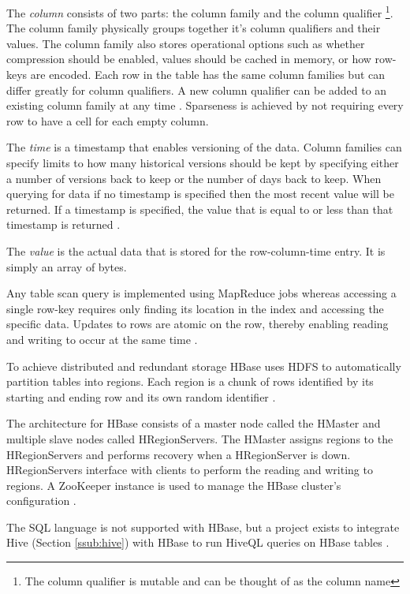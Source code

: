 \documentclass[12pt]{article}
\begin{document}
The \textit{column} consists of two parts: the column family and the column qualifier \footnote{The column qualifier is mutable and can be thought of as the column name}. The column family physically groups together it's column qualifiers and their values. The column family also stores operational options such as whether compression should be enabled, values should be cached in memory, or how row-keys are encoded. Each row in the table has the same column families but can differ greatly for column qualifiers. A new column qualifier can be added to an existing column family at any time \cite{hbasedocs}. Sparseness is achieved by not requiring every row to have a cell for each empty column.

The \textit{time} is a timestamp that enables versioning of the data. Column families can specify limits to how many historical versions should be kept by specifying either a number of versions back to keep or the number of days back to keep. When querying for data if no timestamp is specified then the most recent value will be returned. If a timestamp is specified, the value that is equal to or less than that timestamp is returned \cite{hbasedocs,hbasejimbojw}.

The \textit{value} is the actual data that is stored for the row-column-time entry. It is simply an array of bytes.

Any table scan query is implemented using MapReduce jobs whereas accessing a single row-key requires only finding its location in the index and accessing the specific data. Updates to rows are atomic on the row, thereby enabling reading and writing to occur at the same time \cite{hbaseanalysis}.

To achieve distributed and redundant storage HBase uses HDFS to automatically partition tables into regions. Each region is a chunk of rows identified by its starting and ending row and its own random identifier \cite{hbaseanalysis}.

The architecture for HBase consists of a master node called the HMaster and multiple slave nodes called HRegionServers. The HMaster assigns regions to the HRegionServers and performs recovery when a HRegionServer is down. HRegionServers interface with clients to perform the reading and writing to regions. A ZooKeeper \cite{zookeeper} instance is used to manage the HBase cluster's configuration \cite{hbaseanalysis}.

The SQL language is not supported with HBase, but a project exists to integrate Hive (Section \ref{ssub:hive}) with HBase to run HiveQL queries on HBase tables \cite{hivehbaseintegration}.
\end{document}
